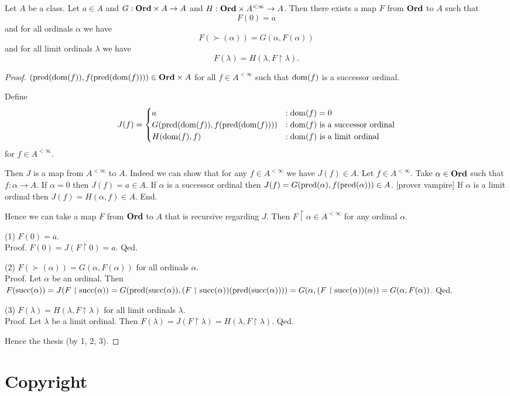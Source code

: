 \documentclass{article}
\begin{document}
  \begin{forthel}
    \begin{corollary*}\label{recursion}
      Let $A$ be a class.
      Let $a \in A$ and $G : \textbf{Ord} \times A \to A$ and $H : \textbf{Ord} \times A^{< \infty} \to A$.
      Then there exists a map $F$ from $\textbf{Ord}$ to $A$ such that
      \[ F(0) = a \]
      and for all ordinals $\alpha$ we have
      \[ F(\succ(\alpha)) = G(\alpha, F(\alpha)) \]
      and for all limit ordinals $\lambda$ we have
      \[ F(\lambda) = H(\lambda, F \restriction \lambda). \]
    \end{corollary*}
    \begin{proof}
      $(\textrm{pred}(\operatorname{dom}(f)), f(\textrm{pred}(\operatorname{dom}(f)))) \in \textbf{Ord} \times A$ for all $f \in A^{< \infty}$ such that $\operatorname{dom}(f)$ is a successor ordinal.

      Define  \[ J(f) =
        \begin{cases}
          a
          & : \operatorname{dom}(f) = 0
          \\
          G(\textrm{pred}(\operatorname{dom}(f)), f(\textrm{pred}(\operatorname{dom}(f))))
          & : \text{$\operatorname{dom}(f)$ is a successor ordinal}
          \\
          H(\operatorname{dom}(f), f)
          & : \text{$\operatorname{dom}(f)$ is a limit ordinal}
        \end{cases} \]
      for $f \in A^{< \infty}$.

      Then $J$ is a map from $A^{< \infty}$ to $A$.
      Indeed we can show that for any $f \in A^{< \infty}$ we have $J(f) \in A$.
        Let $f \in A^{< \infty}$.
        Take $\alpha \in \textbf{Ord}$ such that $f : \alpha \to A$.
        If $\alpha = 0$ then $J(f) = a \in A$.
        If $\alpha$ is a successor ordinal then $J(f) =
        G(\textrm{pred}(\alpha), f(\textrm{pred}(\alpha))) \in A$.
        [prover vampire]
        If $\alpha$ is a limit ordinal then $J(f) = H(\alpha, f) \in A$.
      End.

      Hence we can take a map $F$ from $\textbf{Ord}$ to $A$ that is recursive regarding $J$.
      Then $F \restriction \alpha \in A^{< \infty}$ for any ordinal $\alpha$.

      (1) $F(0) = a$. \\
      Proof.
        $F(0)
          = J(F \restriction 0)
          = a$.
      Qed.

      (2) $F(\succ(\alpha)) = G(\alpha, F(\alpha))$ for all ordinals $\alpha$. \\
      Proof.
        Let $\alpha$ be an ordinal.
        Then $F(\textrm{succ}(\alpha))
          = J(F \restriction \textrm{succ}(\alpha))
          = G(\textrm{pred}(\textrm{succ}(\alpha)), (F \restriction \textrm{succ}(\alpha))(\textrm{pred}(\textrm{succ}(\alpha))))
          = G(\alpha, (F \restriction \textrm{succ}(\alpha))(\alpha))
          = G(\alpha, F(\alpha))$.
      Qed.

      (3) $F(\lambda) = H(\lambda, F \restriction \lambda)$ for all limit ordinals $\lambda$. \\
      Proof.
        Let $\lambda$ be a limit ordinal.
        Then $F(\lambda)
          = J(F \restriction \lambda)
          = H(\lambda, F \restriction \lambda)$.
      Qed.

      Hence the thesis (by 1, 2, 3).
    \end{proof}
  \end{forthel}

  \printbibliography

  \section*{Copyright}
  \doclicenseThis
\end{document}

